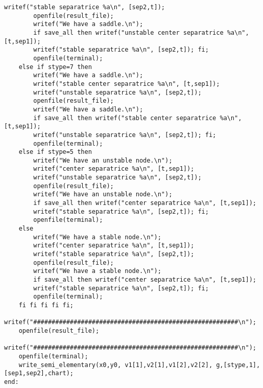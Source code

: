 \documentclass[a4paper,10pt]{article}
\begin{document}
\begin{lstlisting}[name=type]
        writef("stable separatrice %a\n", [sep2,t]);
        openfile(result_file);
        writef("We have a saddle.\n");
        if save_all then writef("unstable center separatrice %a\n", [t,sep1]);
        writef("stable separatrice %a\n", [sep2,t]); fi;
        openfile(terminal);
    else if stype=7 then
        writef("We have a saddle.\n");
        writef("stable center separatrice %a\n", [t,sep1]);
        writef("unstable separatrice %a\n", [sep2,t]);
        openfile(result_file);
        writef("We have a saddle.\n");
        if save_all then writef("stable center separatrice %a\n", [t,sep1]);
        writef("unstable separatrice %a\n", [sep2,t]); fi;
        openfile(terminal);
    else if stype=5 then
        writef("We have an unstable node.\n");
        writef("center separatrice %a\n", [t,sep1]);
        writef("unstable separatrice %a\n", [sep2,t]);
        openfile(result_file);
        writef("We have an unstable node.\n");
        if save_all then writef("center separatrice %a\n", [t,sep1]);
        writef("stable separatrice %a\n", [sep2,t]); fi;
        openfile(terminal);
    else
        writef("We have a stable node.\n");
        writef("center separatrice %a\n", [t,sep1]);
        writef("stable separatrice %a\n", [sep2,t]);
        openfile(result_file);
        writef("We have a stable node.\n");
        if save_all then writef("center separatrice %a\n", [t,sep1]);
        writef("stable separatrice %a\n", [sep2,t]); fi;
        openfile(terminal);
    fi fi fi fi fi;
    writef("########################################################\n");
    openfile(result_file);
    writef("########################################################\n");
    openfile(terminal);
    write_semi_elementary(x0,y0, v1[1],v2[1],v1[2],v2[2], g,[stype,1],[sep1,sep2],chart);
end:
\end{lstlisting}
\end{document}
